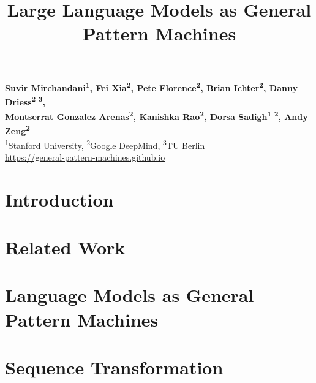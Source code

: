 \documentclass{article}
\title{Large Language Models as General Pattern Machines}
\begin{document}
\maketitle

\vspace{-4.5em}
\begin{center}
    \textbf{
        Suvir Mirchandani\textsuperscript{1},
        Fei Xia\textsuperscript{2},
        Pete Florence\textsuperscript{2},
        Brian Ichter\textsuperscript{2},
        Danny Driess\textsuperscript{2 3}, \\
        Montserrat Gonzalez Arenas\textsuperscript{2},
        Kanishka Rao\textsuperscript{2},
        Dorsa Sadigh\textsuperscript{1 2},
        Andy Zeng\textsuperscript{2}
    }\\
    \textsuperscript{1}Stanford University,
    \textsuperscript{2}Google DeepMind,
    \textsuperscript{3}TU Berlin \\
    \url{https://general-pattern-machines.github.io}
\end{center}
\vspace{1em}

\begin{abstract}

\end{abstract}


\section{Introduction}
\label{sec:introduction}
	

\section{Related Work}
\label{sec:related_work}


\section{Language Models as General Pattern Machines}
\label{sec:result}


\vspace{-1mm}
\section{Sequence Transformation}
\label{sec:sequence_transformation}
\vspace{-3mm}

\end{document}
